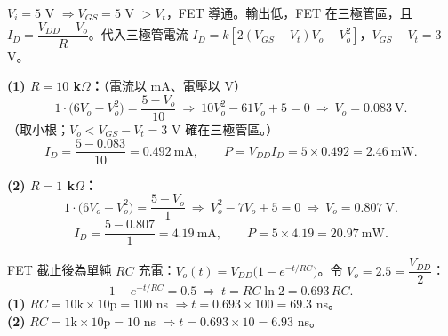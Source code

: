 \documentclass[12pt]{article}
\begin{document}
\begin{minipage}{0.62\linewidth}
\end{minipage}\hfill
\begin{minipage}{0.35\linewidth}
\end{minipage}

\sol $V_i=5$ V $\Rightarrow V_{GS}=5$ V $>V_t$，FET 導通。輸出低，FET 在三極管區，且
$I_D=\dfrac{V_{DD}-V_o}{R}$。代入三極管電流 $I_D=k\!\left[2(V_{GS}-V_t)V_o-V_o^2\right]$，$V_{GS}-V_t=3$ V。

\textbf{(1) $R=10$ k$\Omega$：}（電流以 mA、電壓以 V）
\[ 1\!\cdot\!\big(6V_o-V_o^2\big)=\frac{5-V_o}{10}\ \Rightarrow\ 10V_o^2-61V_o+5=0
   \ \Rightarrow\ V_o=0.083\ \text{V}. \]
（取小根；$V_o<V_{GS}-V_t=3$ V 確在三極管區。）
\[ I_D=\frac{5-0.083}{10}=0.492\ \text{mA},\qquad
   P=V_{DD}I_D=5\times0.492=2.46\ \text{mW}. \]

\textbf{(2) $R=1$ k$\Omega$：}
\[ 1\!\cdot\!\big(6V_o-V_o^2\big)=\frac{5-V_o}{1}\ \Rightarrow\ V_o^2-7V_o+5=0
   \ \Rightarrow\ V_o=0.807\ \text{V}. \]
\[ I_D=\frac{5-0.807}{1}=4.19\ \text{mA},\qquad P=5\times4.19=20.97\ \text{mW}. \]

\sol FET 截止後為單純 $RC$ 充電：$V_o(t)=V_{DD}\big(1-e^{-t/RC}\big)$。令 $V_o=2.5=\dfrac{V_{DD}}{2}$：
\[ 1-e^{-t/RC}=0.5\ \Rightarrow\ t=RC\ln 2=0.693\,RC. \]
\textbf{(1)} $RC=10\text{k}\times10\text{p}=100$ ns $\Rightarrow t=0.693\times100=69.3$ ns。\\
\textbf{(2)} $RC=1\text{k}\times10\text{p}=10$ ns $\Rightarrow t=0.693\times10=6.93$ ns。
\end{document}
